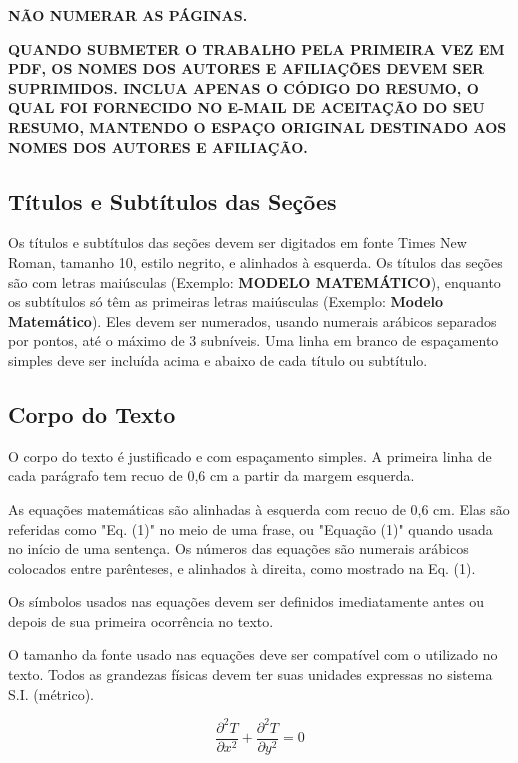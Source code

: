 \documentclass[10pt,fleqn,a4paper]{article}
\begin{document}
        \textbf{\textcolor[rgb]{0.98,0.00,0.00}{NÃO NUMERAR AS PÁGINAS.}}

        \textbf{\textcolor[rgb]{1.00,0.00,0.00}{QUANDO SUBMETER O TRABALHO PELA PRIMEIRA VEZ EM PDF, OS NOMES DOS AUTORES E AFILIAÇÕES DEVEM SER SUPRIMIDOS. INCLUA APENAS O CÓDIGO DO RESUMO, O QUAL FOI FORNECIDO NO E-MAIL DE ACEITAÇÃO DO SEU RESUMO, MANTENDO O ESPAÇO ORIGINAL DESTINADO AOS NOMES DOS AUTORES E AFILIAÇÃO.}}


    \subsection{Títulos e Subtítulos das Seções }

        Os títulos e subtítulos das seções devem ser digitados em fonte Times New Roman, tamanho 10, estilo negrito, e alinhados à esquerda. Os títulos das seções são com letras maiúsculas (Exemplo: \textbf{MODELO MATEMÁTICO}), enquanto os subtítulos só têm as primeiras letras maiúsculas (Exemplo: \textbf{Modelo Matemático}). Eles devem ser numerados, usando numerais arábicos separados por pontos, até o máximo de 3 subníveis. Uma linha em branco de espaçamento simples deve ser incluída acima e abaixo de cada título ou subtítulo.

    \subsection{Corpo do Texto}

        O corpo do texto é justificado e com espaçamento simples. A primeira linha de cada parágrafo tem recuo de 0,6 cm a partir da margem esquerda.

        As equações matemáticas são alinhadas à esquerda com recuo de 0,6 cm.  Elas são referidas como "Eq. (1)" no meio de uma frase, ou "Equação (1)" quando usada no início de uma sentença. Os números das equações são numerais arábicos colocados entre parênteses, e alinhados à direita, como mostrado na Eq. (1).

        Os símbolos usados nas equações devem ser definidos imediatamente antes ou depois de sua primeira ocorrência no texto. \citep{artigoMangaSBAI}

        O tamanho da fonte usado nas equações deve ser compatível com o utilizado no texto. Todos as grandezas físicas devem ter suas unidades expressas no sistema S.I. (métrico).

        \begin{equation}
        \frac{\partial^2 T}{\partial x^2} + \frac{\partial^2 T}{\partial y^2} = 0 \label{equation1}
        \end{equation}
\end{document}
